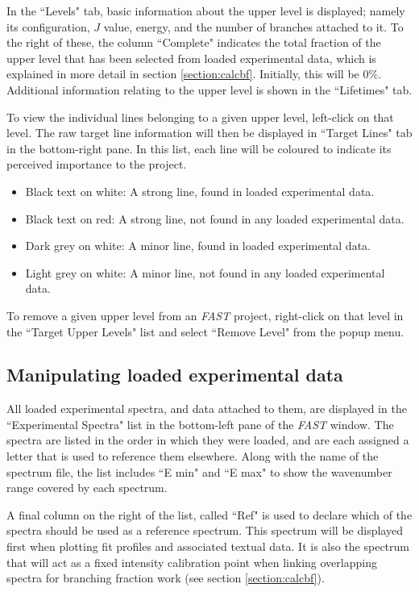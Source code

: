 \documentclass[a4paper,12pt]{report}
\newcommand{\fast}{\emph{FAST} }
\begin{document}
In the ``Levels" tab, basic information about the upper level is displayed; namely its configuration, $J$ value, energy, and the number of branches attached to it. To the right of these, the column ``Complete" indicates the total fraction of the upper level that has been selected from loaded experimental data, which is explained in more detail in section \ref{section:calcbf}. Initially, this will be 0\%. Additional information relating to the upper level is shown in the ``Lifetimes" tab.

To view the individual lines belonging to a given upper level, left-click on that level. The raw target line information will then be displayed in ``Target Lines" tab in the bottom-right pane. In this list, each line will be coloured to indicate its perceived importance to the project.
\begin{itemize}
\item Black text on white: A strong line, found in loaded experimental data.
\item \colorbox{strong_not_found}{Black text on red}: A strong line, not found in any loaded experimental data.
\item \textcolor{weak_found}{Dark grey on white}: A minor line, found in  loaded experimental data.
\item\textcolor{weak_not_found}{Light grey on white}: A minor line, not found in any loaded experimental data.
\end{itemize}

To remove a given upper level from an \fast project, right-click on that level in the ``Target Upper Levels" list and select ``Remove Level" from the popup menu.

\subsection{Manipulating loaded experimental data}
All loaded experimental spectra, and data attached to them, are displayed in the ``Experimental Spectra" list in the bottom-left pane of the \fast window. The spectra are listed in the order in which they were loaded, and are each assigned a letter that is used to reference them elsewhere. Along with the name of the spectrum file, the list includes ``E min" and ``E max" to show the wavenumber range covered by each spectrum. 

A final column on the right of the list, called ``Ref" is used to declare which of the spectra should be used as a reference spectrum. This spectrum will be displayed first when plotting fit profiles and associated textual data. It is also the spectrum that will act as a fixed intensity calibration point when linking overlapping spectra for branching fraction work (see section \ref{section:calcbf}).
\end{document}
